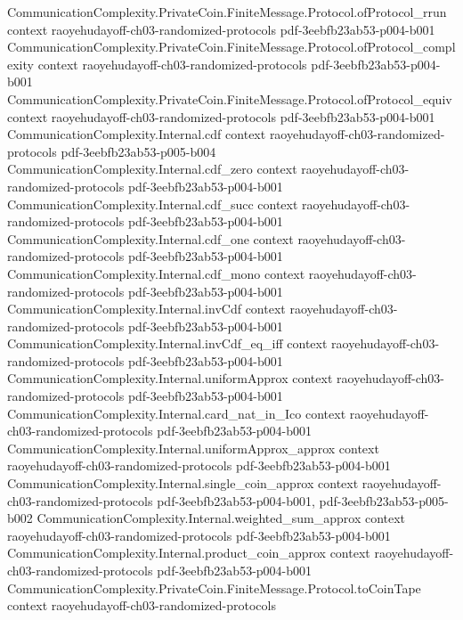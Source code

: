 \begin{theorem}
  {CommunicationComplexity.PrivateCoin.FiniteMessage.Protocol.ofProtocol_rrun}
  {context}
  {raoyehudayoff-ch03-randomized-protocols}
  {pdf-3eebfb23ab53-p004-b001}
\proofstep
  {CommunicationComplexity.PrivateCoin.FiniteMessage.Protocol.ofProtocol_complexity}
  {context}
  {raoyehudayoff-ch03-randomized-protocols}
  {pdf-3eebfb23ab53-p004-b001}
\proofstep
  {CommunicationComplexity.PrivateCoin.FiniteMessage.Protocol.ofProtocol_equiv}
  {context}
  {raoyehudayoff-ch03-randomized-protocols}
  {pdf-3eebfb23ab53-p004-b001}
\proofstep
  {CommunicationComplexity.Internal.cdf}
  {context}
  {raoyehudayoff-ch03-randomized-protocols}
  {pdf-3eebfb23ab53-p005-b004}
\proofstep
  {CommunicationComplexity.Internal.cdf_zero}
  {context}
  {raoyehudayoff-ch03-randomized-protocols}
  {pdf-3eebfb23ab53-p004-b001}
\proofstep
  {CommunicationComplexity.Internal.cdf_succ}
  {context}
  {raoyehudayoff-ch03-randomized-protocols}
  {pdf-3eebfb23ab53-p004-b001}
\proofstep
  {CommunicationComplexity.Internal.cdf_one}
  {context}
  {raoyehudayoff-ch03-randomized-protocols}
  {pdf-3eebfb23ab53-p004-b001}
\proofstep
  {CommunicationComplexity.Internal.cdf_mono}
  {context}
  {raoyehudayoff-ch03-randomized-protocols}
  {pdf-3eebfb23ab53-p004-b001}
\proofstep
  {CommunicationComplexity.Internal.invCdf}
  {context}
  {raoyehudayoff-ch03-randomized-protocols}
  {pdf-3eebfb23ab53-p004-b001}
\proofstep
  {CommunicationComplexity.Internal.invCdf_eq_iff}
  {context}
  {raoyehudayoff-ch03-randomized-protocols}
  {pdf-3eebfb23ab53-p004-b001}
\proofstep
  {CommunicationComplexity.Internal.uniformApprox}
  {context}
  {raoyehudayoff-ch03-randomized-protocols}
  {pdf-3eebfb23ab53-p004-b001}
\proofstep
  {CommunicationComplexity.Internal.card_nat_in_Ico}
  {context}
  {raoyehudayoff-ch03-randomized-protocols}
  {pdf-3eebfb23ab53-p004-b001}
\proofstep
  {CommunicationComplexity.Internal.uniformApprox_approx}
  {context}
  {raoyehudayoff-ch03-randomized-protocols}
  {pdf-3eebfb23ab53-p004-b001}
\proofstep
  {CommunicationComplexity.Internal.single_coin_approx}
  {context}
  {raoyehudayoff-ch03-randomized-protocols}
  {pdf-3eebfb23ab53-p004-b001,
    pdf-3eebfb23ab53-p005-b002}
\proofstep
  {CommunicationComplexity.Internal.weighted_sum_approx}
  {context}
  {raoyehudayoff-ch03-randomized-protocols}
  {pdf-3eebfb23ab53-p004-b001}
\proofstep
  {CommunicationComplexity.Internal.product_coin_approx}
  {context}
  {raoyehudayoff-ch03-randomized-protocols}
  {pdf-3eebfb23ab53-p004-b001}
\proofstep
  {CommunicationComplexity.PrivateCoin.FiniteMessage.Protocol.toCoinTape}
  {context}
  {raoyehudayoff-ch03-randomized-protocols}

\end{theorem}
